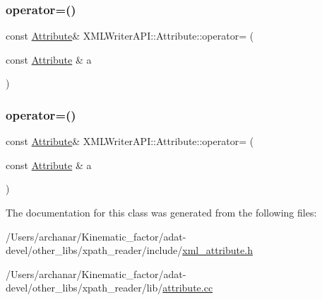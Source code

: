 \mbox{\label{classXMLWriterAPI_1_1Attribute_a073917fc63e79e3f44d26c8a689d40e4}} 
\subsubsection{\texorpdfstring{operator=()}{operator=()}\hspace{0.1cm}{\footnotesize\ttfamily [2/3]}}
{\footnotesize\ttfamily const \mbox{\hyperlink{classXMLWriterAPI_1_1Attribute}{Attribute}}\& X\+M\+L\+Writer\+A\+P\+I\+::\+Attribute\+::operator= (\begin{DoxyParamCaption}\item[{const \mbox{\hyperlink{classXMLWriterAPI_1_1Attribute}{Attribute}} \&}]{a }\end{DoxyParamCaption})}

\mbox{\label{classXMLWriterAPI_1_1Attribute_a073917fc63e79e3f44d26c8a689d40e4}} 
\subsubsection{\texorpdfstring{operator=()}{operator=()}\hspace{0.1cm}{\footnotesize\ttfamily [3/3]}}
{\footnotesize\ttfamily const \mbox{\hyperlink{classXMLWriterAPI_1_1Attribute}{Attribute}}\& X\+M\+L\+Writer\+A\+P\+I\+::\+Attribute\+::operator= (\begin{DoxyParamCaption}\item[{const \mbox{\hyperlink{classXMLWriterAPI_1_1Attribute}{Attribute}} \&}]{a }\end{DoxyParamCaption})}



The documentation for this class was generated from the following files\+:\begin{DoxyCompactItemize}
\item 
/\+Users/archanar/\+Kinematic\+\_\+factor/adat-\/devel/other\+\_\+libs/xpath\+\_\+reader/include/\mbox{\hyperlink{adat-devel_2other__libs_2xpath__reader_2include_2xml__attribute_8h}{xml\+\_\+attribute.\+h}}\item 
/\+Users/archanar/\+Kinematic\+\_\+factor/adat-\/devel/other\+\_\+libs/xpath\+\_\+reader/lib/\mbox{\hyperlink{adat-devel_2other__libs_2xpath__reader_2lib_2attribute_8cc}{attribute.\+cc}}\end{DoxyCompactItemize}
